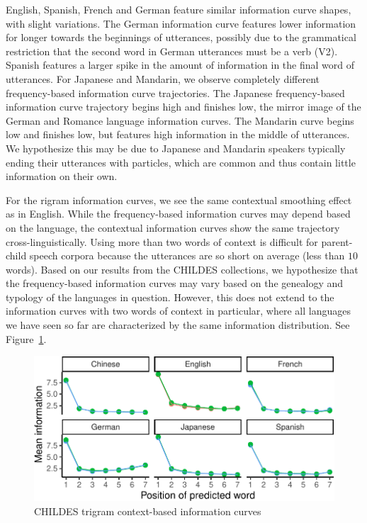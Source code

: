 \documentclass[man,floatsintext]{apa6}
\begin{document}
English, Spanish, French and German feature similar information curve shapes, with slight variations. The German information curve features lower information for longer towards the beginnings of utterances, possibly due to the grammatical restriction that the second word in German utterances must be a verb (V2). Spanish features a larger spike in the amount of information in the final word of utterances. For Japanese and Mandarin, we observe completely different frequency-based information curve trajectories. The Japanese frequency-based information curve trajectory begins high and finishes low, the mirror image of the German and Romance language information curves. The Mandarin curve begins low and finishes low, but features high information in the middle of utterances. We hypothesize this may be due to Japanese and Mandarin speakers typically ending their utterances with particles, which are common and thus contain little information on their own.

For the rigram information curves, we see the same contextual smoothing effect as in English. While the frequency-based information curves may depend based on the language, the contextual information curves show the same trajectory cross-linguistically. Using more than two words of context is difficult for parent-child speech corpora because the utterances are so short on average (less than \(10\) words). Based on our results from the CHILDES collections, we hypothesize that the frequency-based information curves may vary based on the genealogy and typology of the languages in question. However, this does not extend to the information curves with two words of context in particular, where all languages we have seen so far are characterized by the same information distribution. See Figure~\ref{fig:childes-trigrams}.

\begin{figure}
\centering
\includegraphics{figs/childes-trigrams-1.pdf}
\caption{\label{fig:childes-trigrams}CHILDES trigram context-based information curves}
\end{figure}
\end{document}
